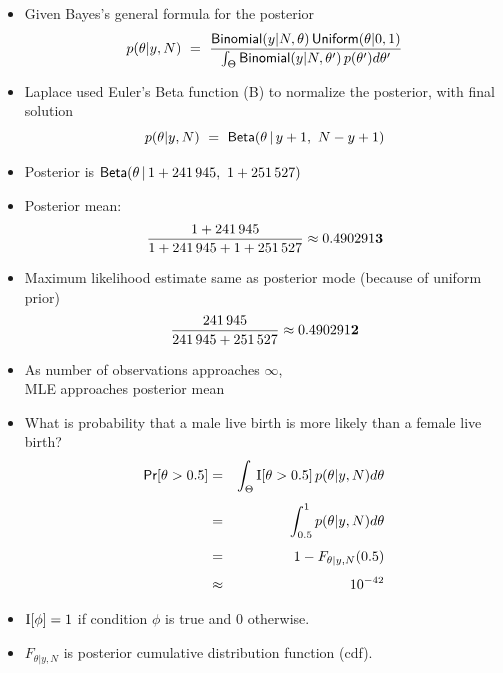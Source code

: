 \documentclass[10pt]{report}
\begin{document}
\begin{itemize}
\item Given Bayes's general formula for the posterior
\[
p(\theta|y,N) 
\ = \ 
\frac{\distro{Binomial}(y|N,\theta) \, \distro{Uniform}(\theta|0,1)}
     {\int_{\Theta} \distro{Binomial}(y|N,\theta') \,  p(\theta')
       d\theta'}
\]
\item Laplace used Euler's Beta function (B) to normalize the
  posterior, with final solution
\[
p(\theta|y,N) 
\ = \ \text{\sf Beta}(\theta \, | \, y + 1, \ N - y + 1)
\]
\end{itemize}

\begin{itemize}
\item Posterior is $\text{\sf Beta}(\theta \, | \, 1 + 241\,945, \ 1 + 251\,527)$
\item Posterior mean: 
\[
\frac{1 + 241\,945}
     {1 + 241\,945 + 1 + 251\,527}
\approx 0.490291{\bf3}
\]
\item Maximum likelihood estimate same as posterior mode (because
  of uniform prior) 
\[
\frac{241\,945}
     {241\,945 + 251\,527}
\approx 0.490291{\bf2}
\]
\item As number of observations approaches $\infty$, 
\\
MLE approaches posterior mean
\end{itemize}

\begin{itemize}
\item What is probability that a male live birth is more likely than a
  female live birth?
\begin{eqnarray*}
\text{\sf Pr}[\theta > 0.5] 
& = &  \int_{\Theta} \text{I}[\theta > 0.5] \, p(\theta|y,N) d\theta
\\[4pt]
& = &  \int_{0.5}^1 p(\theta|y,N) d\theta
\\[4pt]
& = &  1 - F_{\theta|y,N}(0.5)
\\[4pt]
& \approx &  10^{-42}
\end{eqnarray*}
\item $\text{I}[\phi] = 1$ if condition $\phi$ is true and 0 otherwise.
\item  $F_{\theta|y,N}$ is posterior cumulative distribution
function (cdf).
\end{itemize}
\end{document}
